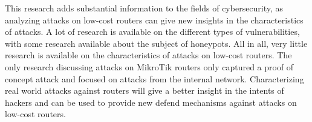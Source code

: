 This research adds substantial information to the fields of cybersecurity, as analyzing attacks on low-cost routers can give new insights in the characteristics of attacks. A lot of research is available on the different types of vulnerabilities, with some research available about the subject of honeypots. All in all, very little research is available on the characteristics of attacks on low-cost routers. The only research discussing attacks on MikroTik routers \cite{ROUTEROSFORENSICS:IJCSIS:2017} only captured a proof of concept attack and focused on attacks from the internal network. Characterizing real world attacks against routers will give a better insight in the intents of hackers and can be used to provide new defend mechanisms against attacks on low-cost routers.

